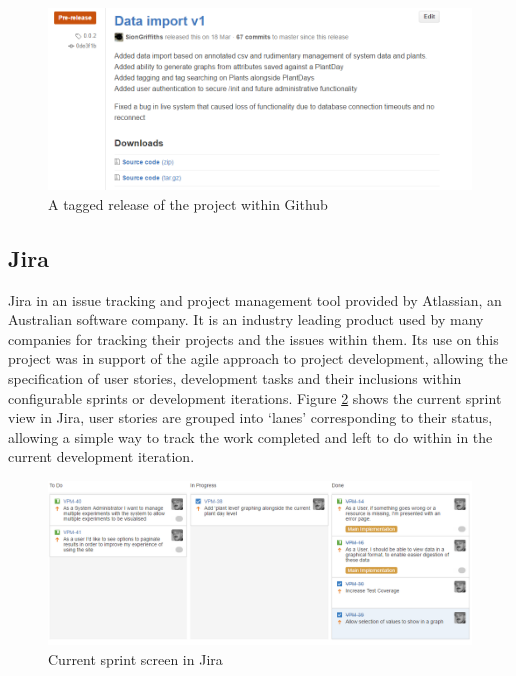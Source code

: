 \begin{figure}[H]
    \centering
    \includegraphics[width=\textwidth]{images/tools/gitrel}
    \caption{A tagged release of the project within Github}
    \label{fig:gitrel}
\end{figure}

\subsection{Jira} \label{jira_sec}

Jira \cite{jira} in an issue tracking and project management tool provided by Atlassian, an Australian software company. It is an industry leading product used by many companies for tracking their projects and the issues within them. Its use on this project was in support of the agile approach to project development, allowing the specification of user stories, development tasks and their inclusions within configurable sprints or development iterations. Figure \ref{fig:jira_sprint} shows the current sprint view in Jira, user stories are grouped into `lanes' corresponding to their status, allowing a simple way to track the work completed and left to do within in the current development iteration.

\begin{figure}[H]
    \centering
    \includegraphics[width=\textwidth]{images/tools/sprint1}
    \caption{Current sprint screen in Jira}
    \label{fig:jira_sprint}
\end{figure} 

